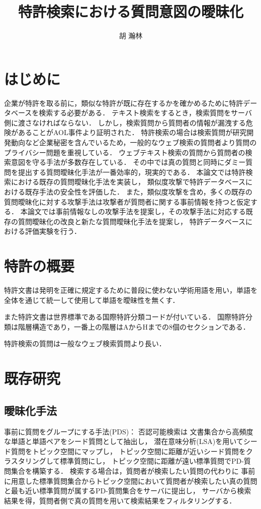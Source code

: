 \documentclass[papersize]{suribtabst}
\title{特許検索における質問意図の曖昧化}
\author{胡 瀚林}
\begin{document}
\maketitle

\section{はじめに} %
企業が特許を取る前に，類似な特許が既に存在するかを確かめるために特許データベースを検索する必要がある．
テキスト検索をするとき，検索質問をサーバ側に渡さなければならない．
しかし，検索質問から質問者の情報が漏洩する危険があることがAOL事件\cite{AOL}より証明された．
特許検索の場合は検索質問が研究開発動向など企業秘密を含んでいるため，一般的なウェブ検索の質問者より質問のプライバシー問題を重視している．
ウェブテキスト検索の質問から質問者の検索意図を守る手法が多数存在している．
その中では真の質問と同時にダミー質問を提出する質問曖昧化手法が一番効率的，現実的である．
本論文では特許検索における既存の質問曖昧化手法を実装し，
類似度攻撃\cite{simattack2016}で特許データベースにおける既存手法の安全性を評価した．
また，類似度攻撃を含め，多くの既存の質問曖昧化に対する攻撃手法は攻撃者が質問者に関する事前情報を持つと仮定する．
本論文では事前情報なしの攻撃手法を提案し，その攻撃手法に対応する既存の質問曖昧化の改良と新たな質問曖昧化手法を提案し，
特許データベースにおける評価実験を行う．

\section{特許の概要}
特許文書は発明を正確に規定するために普段に使わない学術用語を用い，単語を全体を通じて統一して使用して単語を曖昧性を無くす．

また特許文書は世界標準である国際特許分類コードが付いている．
国際特許分類は階層構造であり，一番上の階層はAからHまでの8個のセクションである．

特許検索の質問は一般なウェブ検索質問より長い．

\section{既存研究}
\subsection{曖昧化手法}
事前に質問をグループにする手法(PDS)\cite{providing2009}：
否認可能検索は
文書集合から高頻度な単語と単語ペアをシード質問として抽出し，
潜在意味分析(LSA)\cite{LSA1990}を用いてシード質問をトピック空間にマップし，
トピック空間に距離が近いシード質問をクラスタリングして標準質問にし，
トピック空間に距離が遠い標準質問でPD-質問集合を構築する．
検索する場合は，質問者が検索したい質問の代わりに
事前に用意した標準質問集合からトピック空間において質問者が検索したい真の質問と最も近い標準質問が属するPD-質問集合をサーバに提出し，
サーバから検索結果を得，質問者側で真の質問を用いて検索結果をフィルタリングする．
\end{document}
